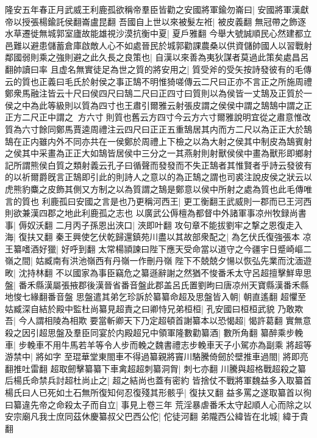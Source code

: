 隆安五年春正月武威王利鹿孤欲稱帝羣臣皆勸之安國將軍鍮勿崙曰|{
	安國將軍漢獻帝以授張楊鍮託侯翻崙盧昆翻}
吾國自上世以來被髮左袵|{
	被皮義翻}
無冠帶之飾逐水草遷徙無城郭室廬故能雄視沙漠抗衡中夏|{
	夏戶雅翻}
今舉大號誠順民心然建都立邑難以避患儲蓄倉庫啟敵人心不如處晉民於城郭勸課農桑以供資儲帥國人以習戰射鄰國弱則乘之強則避之此久長之良策也|{
	自漢以來善為夷狄謀者莫過此策矣處昌呂翻帥讀曰率}
且虚名無實徒足為世之質的將安用之|{
	質受斧的受矢按詩發彼有的毛傳云的質也正義曰毛氏於射侯之事正鵠不明惟猗嗟傳云二尺曰正亦不言正之所施周禮鄭衆馬融注皆云十尺曰侯四尺曰鵠二尺曰正四寸曰質則以為侯皆一丈鵠及正質於一侯之中為此等級則以質為四寸也王肅引爾雅云射張皮謂之侯侯中謂之鵠鵠中謂之正正方二尺正中謂之方六寸則質也舊云方四寸今云方六寸爾雅說明宜從之肅意惟改質為六寸餘同鄭馬賈逵周禮注云四尺曰正正五重鵠居其内而方二尺以為正正大於鵠鵠在正内雖内外不同亦共在一侯鄭於周禮上下檢之以為大射之侯其中制皮為鵠賓射之侯其中采畫為正正大如鵠皆居侯中三分之一其燕射則射獸侯侯中畫為獸形即鄉射記所謂熊侯白質之類射義云孔子曰循聲而發發而不失正鵠者其惟賢者乎詩云發彼有的以祈爾爵旣言正鵠即引此的則詩人之意以的為正鵠之謂也司裘注說皮侯之狀云以虎熊豹麋之皮飾其側又方制之以為質謂之鵠是鄭意以侯中所射之處為質也此毛傳唯言的質也}
利鹿孤曰安國之言是也乃更稱河西王|{
	更工衡翻王武威則一郡而已王河西則欲兼漢四郡之地此利鹿孤之志也}
以廣武公傉檀為都督中外諸軍事凉州牧録尚書事|{
	傉奴沃翻}
二月丙子孫恩出浹口|{
	浹即叶翻}
攻句章不能拔劉牢之撃之恩復走入海|{
	復扶又翻}
秦王興使乞伏乾歸還鎮苑川盡以其故部衆配之|{
	為乞伏氏復強張本}
凉王纂嗜酒好獵|{
	好呼到翻}
太常楊頴諫曰陛下應天受命當以道守之今疆宇日蹙崎嶇二嶺之間|{
	姑臧南有洪池嶺西有丹嶺一作刪丹嶺}
陛下不兢兢夕愓以恢弘先業而沈湎遊畋|{
	沈持林翻}
不以國家為事臣竊危之纂遜辭謝之然猶不悛番禾太守呂超擅擊鮮卑思盤|{
	番禾縣漢屬張掖郡後漢晉省番音盤此郡盖呂氏置劉昫曰唐凉州天寶縣漢番禾縣地悛七緣翻番音盤}
思盤遣其弟乞珍訴於纂纂命超及思盤皆入朝|{
	朝直遙翻}
超懼至姑臧深自結於殿中監杜尚纂見超責之曰卿恃兄弟桓桓|{
	孔安國曰桓桓武貌}
乃敢欺吾|{
	今人謂相陵為相欺}
要當斬卿天下乃定超頓首謝纂本以恐愒超|{
	愒許葛翻}
實無意殺之因引超思盤及羣臣同宴於内殿超兄中領軍隆數勸纂酒|{
	數所角翻}
纂醉乘步輓車|{
	步輓車不用牛馬若羊等令人步而輓之魏書禮志步輓車天子小駕亦為副乘}
將超等游禁中|{
	將如字}
至琨華堂東閤車不得過纂親將竇川駱騰倚劒於壁推車過閤|{
	將即亮翻推吐雷翻}
超取劒擊纂纂下車禽超超刺纂洞胷|{
	刺七亦翻}
川騰與超格戰超殺之纂后楊氏命禁兵討超杜尚止之|{
	超之結尚也蓋有密約}
皆捨仗不戰將軍魏益多入取纂首楊氏曰人已死如土石無所復知何忍復殘其形骸乎|{
	復扶又翻}
益多罵之遂取纂首以徇曰纂違先帝之命殺太子而自立|{
	事見上卷三年}
荒淫暴虐番禾太守起順人心而除之以安宗廟凡我士庶同茲休慶纂叔父巴西公佗|{
	佗徒河翻}
弟隴西公緯皆在北城|{
	緯于貴翻}
